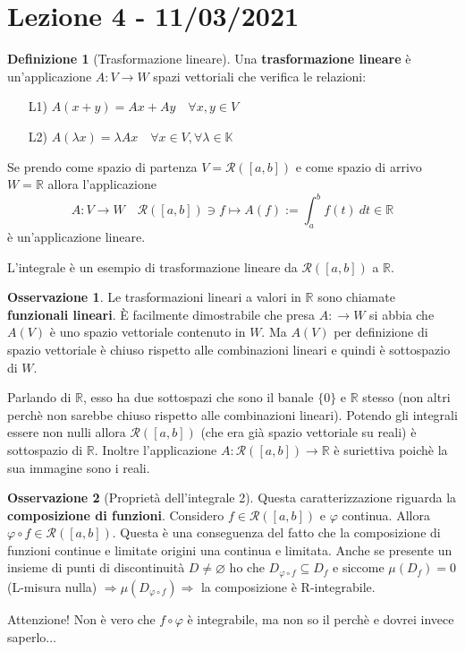 \documentclass{article}
\theoremstyle{definition}
\theoremstyle{definition}
\theoremstyle{definition}
\newtheorem{definition}{Definizione}[section]
\theoremstyle{definition}
\newtheorem{remark}{Osservazione}[section]
\theoremstyle{definition}
\begin{document}
\newpage
\section{Lezione 4 - 11/03/2021}

\begin{definition}[Trasformazione lineare] 
    Una \textbf{trasformazione lineare} è un'applicazione $A:V\rightarrow W$ spazi vettoriali che verifica le relazioni:
    \begin{enumerate}
        \item [L1)] $A(x+y) = Ax+Ay \quad \forall x,y \in V$
        \item [L2)] $A(\lambda x)=\lambda A x \quad \forall x \in V, \forall \lambda \in \mathbb{K}$
    \end{enumerate}

    Se prendo come spazio di partenza $V=\mathcal{R}([a,b])$ e come spazio di arrivo $W=\mathbb{R}$ allora l'applicazione 
    \[
        A:V\rightarrow W \quad \mathcal{R}([a,b]) \ni f \mapsto A(f) := \int_{a}^{b}f(t) \: dt \in \mathbb{R}
    \]
    è un'applicazione lineare.

    L'integrale è un esempio di trasformazione lineare da $\mathcal{R}([a,b])$ a $\mathbb{R}$.
\end{definition}

\begin{remark}
    Le trasformazioni lineari a valori in $\mathbb{R}$ sono chiamate \textbf{funzionali lineari}. È facilmente dimostrabile che presa $A: \rightarrow W$ si abbia che $A(V)$ è uno spazio vettoriale contenuto in $W$. Ma $A(V)$ per definizione di spazio vettoriale è chiuso rispetto alle combinazioni lineari e quindi è sottospazio di $W$. 
    
    Parlando di $\mathbb{R}$, esso ha due sottospazi che sono il banale $\lbrace 0 \rbrace$ e $\mathbb{R}$ stesso (non altri perchè non sarebbe chiuso rispetto alle combinazioni lineari). Potendo gli integrali essere non nulli allora $\mathcal{R}([a,b])$ (che era già spazio vettoriale su reali) è sottospazio di $\mathbb{R}$.
    Inoltre l'applicazione $A:\mathcal{R}([a,b])\rightarrow \mathbb{R}$ è suriettiva poichè la sua immagine sono i reali.

\end{remark}

\begin{remark}[Proprietà dell'integrale 2]
    Questa caratterizzazione riguarda la \textbf{composizione di funzioni}. Considero $f\in\mathcal{R}([a,b])$ e $\varphi$ continua. Allora $\varphi \circ f \in \mathcal{R}([a,b])$. Questa è una conseguenza del fatto che la composizione di funzioni continue e limitate origini una continua e limitata. Anche se presente un insieme di punti di discontinuità $D\neq \varnothing$ ho che $D_{\varphi \circ f} \subseteq D_f$ e siccome $\mu(D_f)=0$ (L-misura nulla) $\Rightarrow \mu(D_{\varphi\circ f}) \Rightarrow$ la composizione è R-integrabile.

    Attenzione! Non è vero che $f\circ\varphi$ è integrabile, ma non so il perchè e dovrei invece saperlo...
\end{remark}
\end{document}
